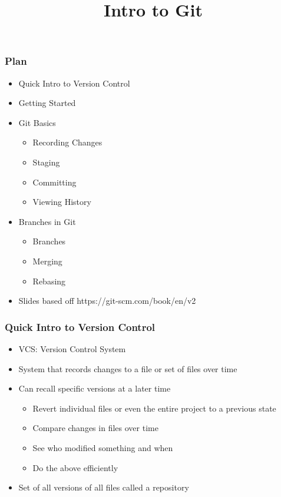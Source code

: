 \documentclass{beamer}
\title{Intro to Git}
\date{}
\begin{document}
\frame{\titlepage}

\begin{frame}
	\frametitle{Plan}
	\begin{itemize}
		\item{Quick Intro to Version Control}
		\item{Getting Started}
		\item{Git Basics}
		\begin{itemize}
			\item{Recording Changes}
			\item{Staging}
			\item{Committing}
			\item{Viewing History}
		\end{itemize}
		\item{Branches in Git}
		\begin{itemize}
			\item{Branches}
			\item{Merging}
			\item{Rebasing}
		\end{itemize}
		\item{Slides based off https://git-scm.com/book/en/v2}
	\end{itemize}
\end{frame}


\begin{frame}
	\frametitle{Quick Intro to Version Control}
	\begin{itemize}
		\item{VCS: Version Control System}
		\item{System that records changes to a file or set of files over time}
		\item{Can recall specific versions at a later time}
		\begin{itemize}
			\item{Revert individual files or even the entire project to a previous state}
			\item{Compare changes in files over time}
			\item{See who modified something and when}
			\item{Do the above efficiently}
		\end{itemize}
		\item{Set of all versions of all files called a repository}
	\end{itemize}
\end{frame}
\end{document}
